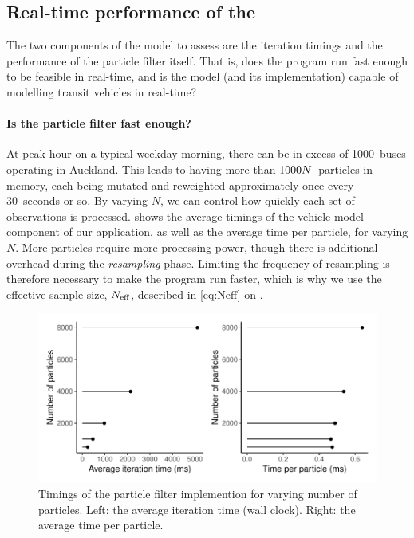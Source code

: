 \subsection{Real-time performance of the \pf{}}
\label{sec:pf_issues}



The two components of the model to assess are the iteration timings and the performance of the particle filter itself. That is, does the program run fast enough to be feasible in real-time, and is the model (and its \pf{} implementation) capable of modelling transit vehicles in real-time?


\paragraph{Is the particle filter fast enough?}
At peak hour on a typical weekday morning, there can be in excess of 1000~buses operating in Auckland. This leads to having more than $1000N$~particles in memory, each being mutated and reweighted approximately once every 30~seconds or so. By varying $N$, we can control how quickly each set of observations is processed.  shows the average timings of the vehicle model component of our application, as well as the average time per particle, for varying $N$. More particles require more processing power, though there is additional overhead during the \emph{resampling} phase. Limiting the frequency of resampling is therefore necessary to make the program run faster, which is why we use the effective sample size, $N_\text{eff}$, described in \cref{eq:Neff} on .


\begin{knitrout}\small
{}\color{fgcolor}\begin{figure}

{\centering \includegraphics[width=.8\textwidth]{figure/pf_timings-1} 

}

\caption[Timings of the particle filter implemention for varying number of particles]{Timings of the particle filter implemention for varying number of particles. Left: the average iteration time (wall clock). Right: the average time per particle.}\label{fig:pf_timings}
\end{figure}


\end{knitrout}


